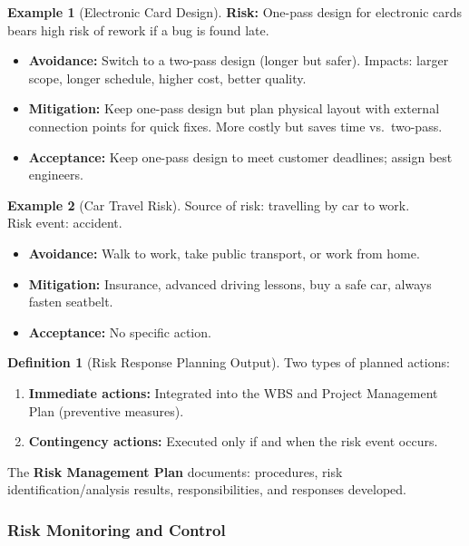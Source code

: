 \documentclass[11pt,a4paper]{article}
\theoremstyle{definition}
\newtheorem{definition}{Definition}[section]
\newtheorem{example}{Example}[section]
\theoremstyle{plain}
\begin{document}
\begin{example}[Electronic Card Design]
\textbf{Risk:} One-pass design for electronic cards bears high risk of rework if a bug is found late.
\begin{itemize}[nosep]
  \item \textbf{Avoidance:} Switch to a two-pass design (longer but safer). Impacts: larger scope, longer schedule, higher cost, better quality.
  \item \textbf{Mitigation:} Keep one-pass design but plan physical layout with external connection points for quick fixes. More costly but saves time vs.\ two-pass.
  \item \textbf{Acceptance:} Keep one-pass design to meet customer deadlines; assign best engineers.
\end{itemize}
\end{example}

\begin{example}[Car Travel Risk]
Source of risk: travelling by car to work.\\
Risk event: accident.
\begin{itemize}[nosep]
  \item \textbf{Avoidance:} Walk to work, take public transport, or work from home.
  \item \textbf{Mitigation:} Insurance, advanced driving lessons, buy a safe car, always fasten seatbelt.
  \item \textbf{Acceptance:} No specific action.
\end{itemize}
\end{example}

\begin{definition}[Risk Response Planning Output]
Two types of planned actions:
\begin{enumerate}[nosep, label=\arabic*.]
  \item \textbf{Immediate actions:} Integrated into the WBS and Project Management Plan (preventive measures).
  \item \textbf{Contingency actions:} Executed only if and when the risk event occurs.
\end{enumerate}
The \textbf{Risk Management Plan} documents: procedures, risk identification/analysis results, responsibilities, and responses developed.
\end{definition}

\subsubsection{Risk Monitoring and Control}
\end{document}
